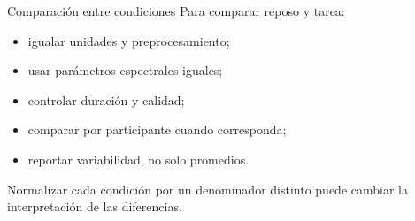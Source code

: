 \documentclass[
  ignorenonframetext,
  aspectratio=169,
  spanish,
]{beamer}
\providecommand{\tightlist}{%
  \setlength{\itemsep}{0pt}\setlength{\parskip}{0pt}}
\begin{document}
\begin{frame}{Comparación entre condiciones}
  \protect{}\label{comparaciuxf3n-entre-condiciones}
  Para comparar reposo y tarea:

  \begin{itemize}
    \tightlist
    \item
          igualar unidades y preprocesamiento;
    \item
          usar parámetros espectrales iguales;
    \item
          controlar duración y calidad;
    \item
          comparar por participante cuando corresponda;
    \item
          reportar variabilidad, no solo promedios.
  \end{itemize}

  \begin{tcolorbox}[enhanced jigsaw, arc=.35mm, bottomrule=.15mm, bottomtitle=1mm, breakable, colback=white, colbacktitle=quarto-callout-warning-color!10!white, colframe=quarto-callout-warning-color-frame, coltitle=black, left=2mm, leftrule=.75mm, opacityback=0, opacitybacktitle=0.6, rightrule=.15mm, title=\textcolor{quarto-callout-warning-color}{\faExclamationTriangle}\hspace{0.5em}{Advertencia}, titlerule=0mm, toprule=.15mm, toptitle=1mm]

    Normalizar cada condición por un denominador distinto puede cambiar la
    interpretación de las diferencias.

  \end{tcolorbox}
\end{frame}
\end{document}
